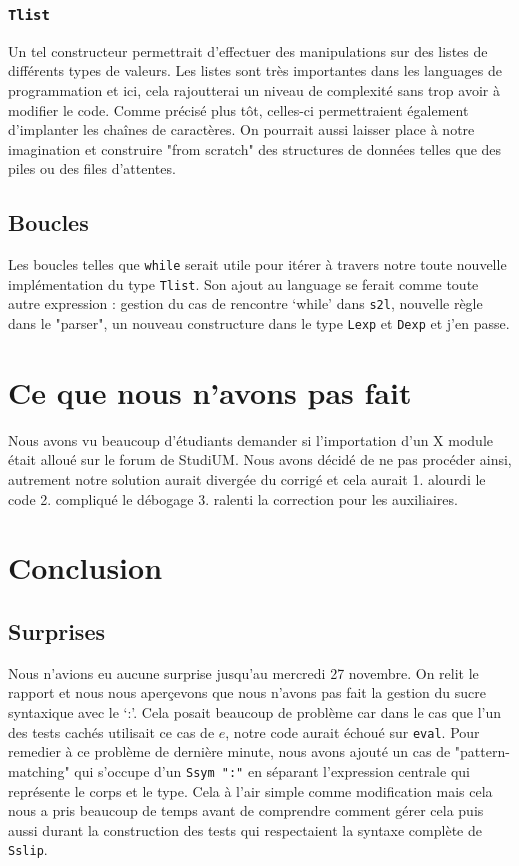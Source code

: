 \documentclass[a4paper,12pt]{article}
\begin{document}
        \subsubsection{\texttt{Tlist}}
            Un tel constructeur permettrait d'effectuer des manipulations sur des listes
            de différents types de valeurs. Les listes sont très importantes dans les 
            languages de programmation et ici, cela rajoutterai un niveau de complexité 
            sans trop avoir à modifier le code. Comme précisé plus tôt, celles-ci permettraient
            également d'implanter les chaînes de caractères. On pourrait aussi laisser
            place à notre imagination et construire "from scratch" des structures de données
            telles que des piles ou des files d'attentes.
    \subsection{Boucles}
        Les boucles telles que \texttt{while} serait utile pour itérer à travers notre toute 
        nouvelle implémentation du type \texttt{Tlist}. Son ajout au language se ferait comme 
        toute autre expression : gestion du cas de rencontre `while' dans \texttt{s2l}, nouvelle
        règle dans le "parser", un nouveau constructure dans le type \texttt{Lexp} et \texttt{Dexp}
        et j'en passe.

\section{Ce que nous n'avons pas fait}
    Nous avons vu beaucoup d'étudiants demander si l'importation d'un
    X module était alloué sur le forum de StudiUM. Nous avons décidé
    de ne pas procéder ainsi, autrement notre solution aurait divergée
    du corrigé et cela aurait 1. alourdi le code 2. compliqué le 
    débogage 3. ralenti la correction pour les auxiliaires.

\section{Conclusion}
    \subsection{Surprises}
        Nous n'avions eu aucune surprise jusqu'au mercredi 27 novembre. On relit le 
        rapport et nous nous aperçevons que nous n'avons pas fait la gestion du sucre
        syntaxique avec le `:'. Cela posait beaucoup de problème car dans le cas que
        l'un des tests cachés utilisait ce cas de $e$, notre code aurait échoué sur
        \texttt{eval}. Pour remedier à ce problème de dernière minute, nous avons 
        ajouté un cas de "pattern-matching" qui s'occupe d'un \texttt{Ssym ":"} en 
        séparant l'expression centrale qui représente le corps et le type. Cela à
        l'air simple comme modification mais cela nous a pris beaucoup de temps avant
        de comprendre comment gérer cela puis aussi durant la construction des tests 
        qui respectaient la syntaxe complète de \texttt{Sslip}. \\
\end{document}
